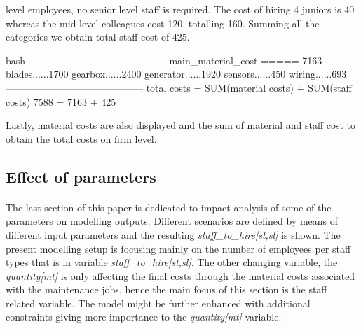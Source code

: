         level employees, no senior level staff is required. The cost of hiring 4 juniors is 
        40 whereas the mid-level colleagues cost 120, totalling 160. Summing all the categories
        we obtain total staff cost of 425.
        \bigskip
        \newline
        \vspace{2pt}
        \begin{boxminted}{bash}
            ------------------------------------------
            main_material_cost ===== 7163
            blades......1700
            gearbox......2400
            generator......1920
            sensors......450
            wiring......693
            ------------------------------------------
            total costs = SUM(material costs) + SUM(staff costs) 
            7588 = 7163 + 425
        \end{boxminted}
        \newline
        Lastly, material costs are also displayed and the sum of material and staff cost to obtain
        the total costs on firm level.

    \subsection{Effect of parameters}
    \paragraph{} The last section of this paper is dedicated to impact analysis of some of the
    parameters on modelling outputs. Different scenarios are defined by means of different input 
    parameters and the resulting \textit{staff\_to\_hire[st,sl]} is shown.
    The present modelling setup is focusing mainly on the number of employees per staff types that is 
    in variable \textit{staff\_to\_hire[st,sl]}. The other changing variable, 
    the \textit{quantity[mt]} is only affecting the final costs through the material costs associated 
    with the maintenance jobs, hence the main focus of this section is the staff related variable. 
    The model might be further enhanced with additional constraints giving more importance 
    to the \textit{quantity[mt]} variable.

    \paragraph{} 